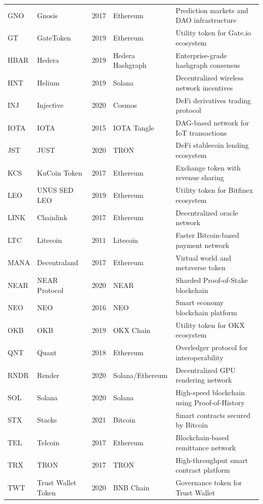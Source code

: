 \documentclass{article}
\begin{document}
\begin{longtable}{llllp{4.2cm}}
GNO & Gnosis & 2017 & Ethereum & Prediction markets and DAO infrastructure \\[4pt]
GT & GateToken & 2019 & Ethereum & Utility token for Gate.io ecosystem \\[4pt]
HBAR & Hedera & 2019 & Hedera Hashgraph & Enterprise-grade hashgraph consensus \\[4pt]
HNT & Helium & 2019 & Solana & Decentralized wireless network incentives \\[4pt]
INJ & Injective & 2020 & Cosmos & DeFi derivatives trading protocol \\[4pt]
IOTA & IOTA & 2015 & IOTA Tangle & DAG-based network for IoT transactions \\[4pt]
JST & JUST & 2020 & TRON & DeFi stablecoin lending ecosystem \\[4pt]
KCS & KuCoin Token & 2017 & Ethereum & Exchange token with revenue sharing \\[4pt]
LEO & UNUS SED LEO & 2019 & Ethereum & Utility token for Bitfinex ecosystem \\[4pt]
LINK & Chainlink & 2017 & Ethereum & Decentralized oracle network \\[4pt]
LTC & Litecoin & 2011 & Litecoin & Faster Bitcoin-based payment network \\[4pt]
MANA & Decentraland & 2017 & Ethereum & Virtual world and metaverse token \\[4pt]
NEAR & NEAR Protocol & 2020 & NEAR & Sharded Proof-of-Stake blockchain \\[4pt]
NEO & NEO & 2016 & NEO & Smart economy blockchain platform \\[4pt]
OKB & OKB & 2019 & OKX Chain & Utility token for OKX ecosystem \\[4pt]
QNT & Quant & 2018 & Ethereum & Overledger protocol for interoperability \\[4pt]
RNDR & Render & 2020 & Solana/Ethereum & Decentralized GPU rendering network \\[4pt]
SOL & Solana & 2020 & Solana & High-speed blockchain using Proof-of-History \\[4pt]
STX & Stacks & 2021 & Bitcoin & Smart contracts secured by Bitcoin \\[4pt]
TEL & Telcoin & 2017 & Ethereum & Blockchain-based remittance network \\[4pt]
TRX & TRON & 2017 & TRON & High-throughput smart contract platform \\[4pt]
TWT & Trust Wallet Token & 2020 & BNB Chain & Governance token for Trust Wallet \\[4pt]

\end{longtable}
\end{document}
